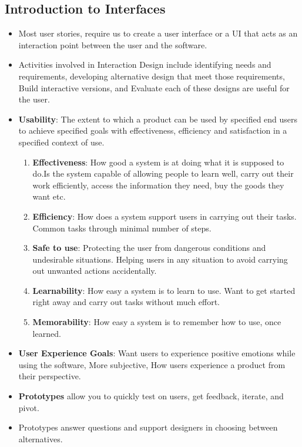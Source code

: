 \documentclass[a4paper]{article}
\begin{document}
\subsection{Introduction to Interfaces}
\begin{itemize}
    \item Most user stories, require us to create a user interface or a UI that acts as an interaction point between the user and the software.
    \item Activities involved in Interaction Design include identifying needs and requirements, developing alternative design that meet those requirements, Build interactive versions, and Evaluate each of these designs are useful for the user.
    \item \textbf{Usability}: The extent to which a product can be used by specified end users to achieve specified goals with effectiveness, efficiency and satisfaction in a specified context of use.
    \begin{enumerate}
        \item \textbf{Effectiveness}: How good a system is at doing what it is supposed to do.Is the system capable of allowing people to learn well, carry out their work efficiently, access the information they need, buy the goods they want etc.
        \item \textbf{Efficiency}: How does a system support users in carrying out their tasks. Common tasks through minimal number of steps.
        \item \textbf{Safe to use}: Protecting the user from dangerous conditions and undesirable situations. Helping users in any situation to avoid carrying out unwanted actions accidentally.
        \item \textbf{Learnability}: How easy a system is to learn to use. Want to get started right away and carry out tasks without much effort.
        \item \textbf{Memorability}: How easy a system is to remember how to use, once learned.
    \end{enumerate}
    \item \textbf{User Experience Goals}: Want users to experience positive emotions while using the software, More subjective, How users experience a product from their perspective.
    \item \textbf{Prototypes} allow you to quickly test on users, get feedback, iterate, and pivot.
    \item Prototypes answer questions and support designers in choosing between alternatives.

\end{itemize}
\end{document}

